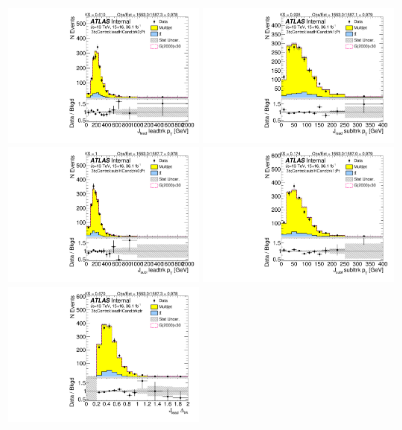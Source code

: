 \begin{figure}[htbp!]
\begin{center}
\includegraphics[angle=270, width=0.45\textwidth]{./figures/boosted/Control/b77_ThreeTag_Control_leadHCand_trk0_Pt.pdf}
\includegraphics[angle=270, width=0.45\textwidth]{./figures/boosted/Control/b77_ThreeTag_Control_leadHCand_trk1_Pt.pdf}\\
\includegraphics[angle=270, width=0.45\textwidth]{./figures/boosted/Control/b77_ThreeTag_Control_sublHCand_trk0_Pt.pdf}
\includegraphics[angle=270, width=0.45\textwidth]{./figures/boosted/Control/b77_ThreeTag_Control_sublHCand_trk1_Pt.pdf}\\
\includegraphics[angle=270, width=0.45\textwidth]{./figures/boosted/Control/b77_ThreeTag_Control_leadHCand_trk_dr.pdf}

\end{center}
\end{figure}
